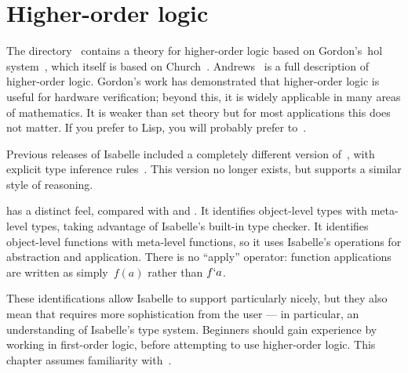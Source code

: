 \chapter{Higher-order logic}
The directory~ contains a theory for higher-order logic
based on Gordon's~{\sc hol} system~\cite{mgordon88a}, which itself is based on
Church~\cite{church40}.  Andrews~\cite{andrews86} is a full description of
higher-order logic.  Gordon's work has demonstrated that higher-order logic
is useful for hardware verification; beyond this, it is widely applicable
in many areas of mathematics.  It is weaker than {\ZF} set theory but for
most applications this does not matter.  If you prefer {\ML} to Lisp, you
will probably prefer {\HOL} to~{\ZF}.

Previous releases of Isabelle included a completely different version
of~{\HOL}, with explicit type inference rules~\cite{paulson-COLOG}.  This
version no longer exists, but  supports a similar style of
reasoning.

{\HOL} has a distinct feel, compared with {\ZF} and {\CTT}.  It
identifies object-level types with meta-level types, taking advantage of
Isabelle's built-in type checker.  It identifies object-level functions
with meta-level functions, so it uses Isabelle's operations for abstraction
and application.  There is no ``apply'' operator: function applications are
written as simply~$f(a)$ rather than $f{\tt`}a$.

These identifications allow Isabelle to support {\HOL} particularly nicely,
but they also mean that {\HOL} requires more sophistication from the user
--- in particular, an understanding of Isabelle's type system.  Beginners
should gain experience by working in first-order logic, before attempting
to use higher-order logic.  This chapter assumes familiarity with~{\FOL{}}.


